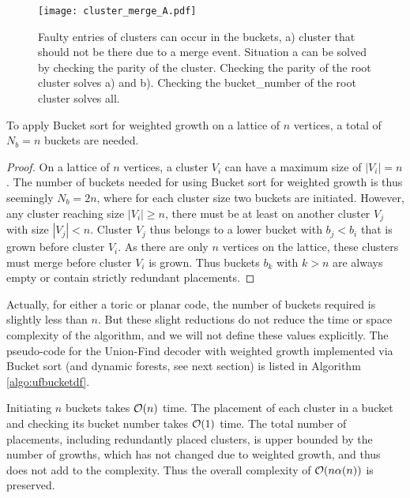 \begin{figure}
  \centering
  \texttt{[image: cluster\_merge\_A.pdf]}
  \caption{Faulty entries of clusters can occur in the buckets, a) cluster that should not be there due to a merge event. Situation a can be solved by checking the parity of the cluster. Checking the parity of the root cluster solves a) and b). Checking the bucket\_number of the root cluster solves all.}\label{3.fig.clustermergeB}
\end{figure}

\begin{lemma}\label{lem:numbuckets}
  To apply Bucket sort for weighted growth on a lattice of $n$ vertices, a total of $N_b = n$ buckets are needed. 
\end{lemma}
\begin{proof}
  On a lattice of $n$ vertices, a cluster $V_i$ can have a maximum size of $|V_i|=n$. The number of buckets needed for using Bucket sort for weighted growth is thus seemingly $N_b = 2n$, where for each cluster size two buckets are initiated. However, any cluster reaching size $|V_i|\geq n$, there must be at least on another cluster $V_j$ with size $|V_j|<n$. Cluster $V_j$ thus belongs to a lower bucket with $b_j < b_i$ that is grown before cluster $V_i$. As there are only $n$ vertices on the lattice, these clusters must merge before cluster $V_i$ is grown. Thus buckets $b_k$ with $k>n$ are always empty or contain strictly redundant placements.
\end{proof}

Actually, for either a toric or planar code, the number of buckets required is slightly less than $n$. But these slight reductions do not reduce the time or space complexity of the algorithm, and we will not define these values explicitly. The pseudo-code for the Union-Find decoder with weighted growth implemented via Bucket sort (and dynamic forests, see next section) is listed in Algorithm \ref{algo:ufbucketdf}. 

Initiating $n$ buckets takes $\mathcal{O}(n)$ time. The placement of each cluster in a bucket and checking its bucket number takes $\mathcal{O}(1)$ time. The total number of placements, including redundantly placed clusters, is upper bounded by the number of growths, which has not changed due to weighted growth, and thus does not add to the complexity. Thus the overall complexity of $\mathcal{O}(n\alpha(n))$ is preserved. 

